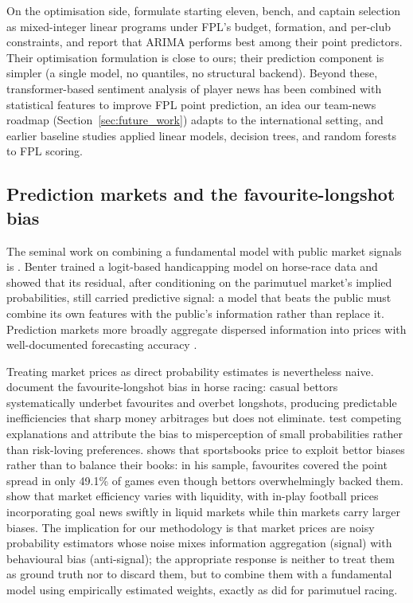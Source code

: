 On the optimisation side, \citet{mishra2025fpl} formulate starting
eleven, bench, and captain selection as mixed-integer linear programs
under FPL's budget, formation, and per-club constraints, and report
that ARIMA performs best among their point predictors. Their
optimisation formulation is close to ours; their prediction component
is simpler (a single model, no quantiles, no structural backend).
Beyond these, transformer-based sentiment analysis of player news has
been combined with statistical features to improve FPL point
prediction,
an idea our team-news roadmap (Section~\ref{sec:future_work}) adapts
to the international setting, and earlier baseline studies applied
linear models, decision trees, and random forests to FPL scoring.

\subsection{Prediction markets and the favourite-longshot bias}
\label{sec:related-markets}

The seminal work on combining a fundamental model with public market
signals is \citet{benter1994computer}. Benter trained a logit-based
handicapping model on horse-race data and showed that its residual,
after conditioning on the parimutuel market's implied probabilities,
still carried predictive signal: a model that beats the public must
combine its own features with the public's information rather than
replace it. Prediction markets more broadly aggregate dispersed
information into prices with well-documented forecasting accuracy
\citep{wolfers2004prediction}.

Treating market prices as direct probability estimates is
nevertheless naive. \citet{thaler1988favorite} document the
favourite-longshot bias in horse racing: casual bettors
systematically underbet favourites and overbet longshots, producing
predictable inefficiencies that sharp money arbitrages but does not
eliminate. \citet{snowberg2010explaining} test competing explanations
and attribute the bias to misperception of small probabilities rather
than risk-loving preferences. \citet{levitt2004sportsbook} shows that
sportsbooks price to exploit bettor biases rather than to balance
their books: in his sample, favourites covered the point spread in
only 49.1\% of games even though bettors overwhelmingly backed them.
\citet{croxson2014information} show that market efficiency varies
with liquidity, with in-play football prices incorporating goal news
swiftly in liquid markets while thin markets carry larger biases.
The implication for our methodology is that market prices are noisy
probability estimators whose noise mixes information aggregation
(signal) with behavioural bias (anti-signal); the appropriate
response is neither to treat them as ground truth nor to discard
them, but to combine them with a fundamental model using empirically
estimated weights, exactly as \citet{benter1994computer} did for
parimutuel racing.

